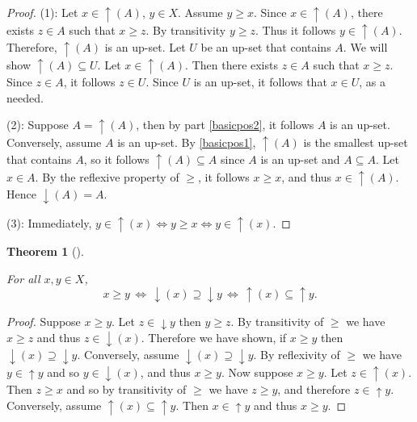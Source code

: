 \documentclass[
  letterpaper,
  10pt,
  reqno,
  twopage,
  openany]{book}
\theoremstyle{plain}
\theoremstyle{definition}
\theoremstyle{definition}
\theoremstyle{definition}
\theoremstyle{plain}
\theoremstyle{plain}
\newtheorem{theorem}{Theorem}[chapter]
\theoremstyle{remark}
\begin{document}
\begin{proof}

(1): Let \(x\in {\uparrow}(A)\), \(y\in X.\) Assume \(y\geq x.\) Since
\(x\in {\uparrow}(A)\), there exists \(z\in A\) such that \(x\geq z.\)
By transitivity \(y\geq z.\) Thus it follows \(y\in {\uparrow}(A).\)
Therefore, \({\uparrow}(A)\) is an up-set. Let \(U\) be an up-set that
contains \(A.\) We will show \({\uparrow}(A)\subseteq U.\) Let
\(x\in {\uparrow}(A).\) Then there exists \(z\in A\) such that
\(x\geq z.\) Since \(z\in A\), it follows \(z\in U.\) Since \(U\) is an
up-set, it follows that \(x\in U\), as a needed.

(2): Suppose \(A={\uparrow}(A)\), then by part \eqref{basicpos2}, it
follows \(A\) is an up-set. Conversely, assume \(A\) is an up-set. By
\eqref{basicpos1}, \({\uparrow}(A)\) is the smallest up-set that
contains \(A\), so it follows \({\uparrow}(A)\subseteq A\) since \(A\)
is an up-set and \(A\subseteq A.\) Let \(x\in A.\) By the reflexive
property of \(\geq\), it follows \(x\geq x\), and thus
\(x\in {\uparrow}(A).\) Hence \({\downarrow}(A)=A.\)

(3): Immediately,
\(y\in {\uparrow}(x) \Longleftrightarrow y\geq x \Longleftrightarrow y\in {\uparrow}(x)\).

\end{proof}

\leavevmode{}%
\begin{theorem}[]\label{thm-isoequiv}

For all \(x,y\in X\), \[
x\geq y \, \Longleftrightarrow \, {\downarrow}(x)\supseteq {\downarrow}{y} \, \Longleftrightarrow \, {\uparrow}(x)\subseteq {\uparrow}{y}.
\]

\end{theorem}

\begin{proof}

Suppose \(x\geq y.\) Let \(z\in {\downarrow}{y}\) then \(y\geq z.\) By
transitivity of \(\geq\) we have \(x\geq z\) and thus
\(z\in {\downarrow}(x).\) Therefore we have shown, if \(x\geq y\) then
\({\downarrow}(x)\supseteq {\downarrow}{y}.\) Conversely, assume
\({\downarrow}(x)\supseteq {\downarrow}{y}.\) By reflexivity of \(\geq\)
we have \(y\in {\uparrow}{y}\) and so \(y\in {\downarrow}(x)\), and thus
\(x\geq y.\) Now suppose \(x\geq y.\) Let \(z\in {\uparrow}(x).\) Then
\(z\geq x\) and so by transitivity of \(\geq\) we have \(z\geq y\), and
therefore \(z\in {\uparrow}{y}.\) Conversely, assume
\({\uparrow}(x)\subseteq {\uparrow}{y}.\) Then \(x\in {\uparrow}{y}\)
and thus \(x\geq y.\)

\end{proof}
\end{document}
